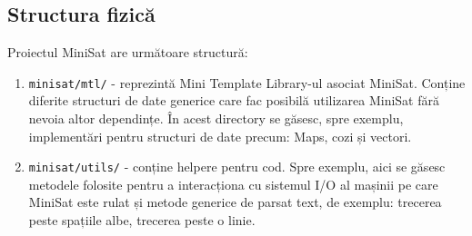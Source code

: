\documentclass{llncs}
\begin{document}
\subsection{Structura fizică}
Proiectul MiniSat are următoare structură:
\begin{enumerate}
    \item \texttt{minisat/mtl/} - reprezintă Mini Template Library-ul asociat MiniSat. Conține diferite structuri de date generice care fac posibilă utilizarea MiniSat fără nevoia altor dependințe. În acest directory se găsesc, spre exemplu, implementări pentru structuri de date precum: Maps, cozi și vectori.

    \item \texttt{minisat/utils/} - conține helpere pentru cod. Spre exemplu, aici se găsesc metodele folosite pentru a interacționa cu sistemul I/O al mașinii pe care MiniSat este rulat și metode generice de parsat text, de exemplu: trecerea peste spațiile albe, trecerea peste o linie.


\end{enumerate}
\end{document}
